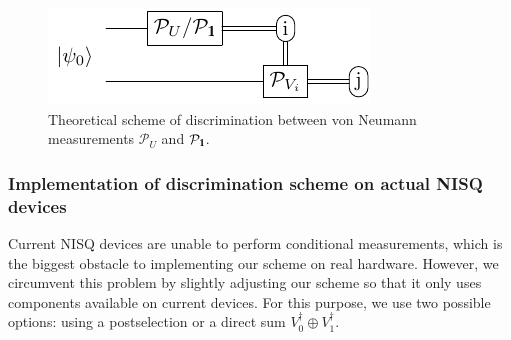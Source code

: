 \documentclass[preprint,12pt, a4paper, dvipsnames]{elsarticle}
\newcommand{\1}{{\rm 1\hspace{-0.9mm}l}}
\newcommand{\Id}{{\rm 1\hspace{-0.9mm}l}}
\newcommand{\PP}{\mathcal{P}}
\theoremstyle{definition}
\begin{document}
\begin{figure}[h!]
	\centering
	\includegraphics[scale=1.7]{pics/theoretical_scheme}
	\caption{Theoretical  scheme of discrimination  between von Neumann measurements $\PP_{U}$ and $\PP_\Id$. }
	\label{fig:theoretical_scheme}
\end{figure}

\subsubsection{Implementation of discrimination scheme on actual NISQ devices}

Current NISQ devices are unable to perform conditional measurements, which is the biggest obstacle
to implementing our scheme on real hardware. However, we circumvent this problem by slightly
adjusting our scheme so that it only uses components available on current devices. For this purpose,
we use two possible options: using a postselection or a direct sum $V_0^\dagger\oplus V_1^\dagger$.
\end{document}
